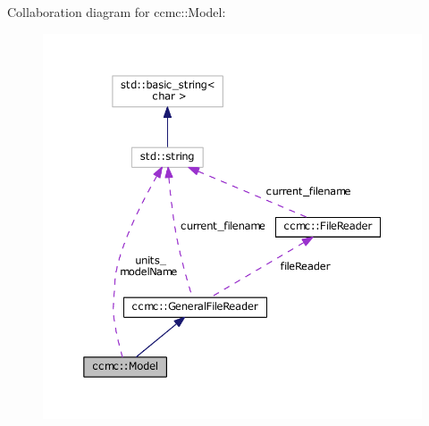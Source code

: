 Collaboration diagram for ccmc\-:\-:Model\-:
\nopagebreak
\begin{figure}[H]
\begin{center}
\leavevmode
\includegraphics[width=350pt]{classccmc_1_1_model__coll__graph}
\end{center}
\end{figure}

